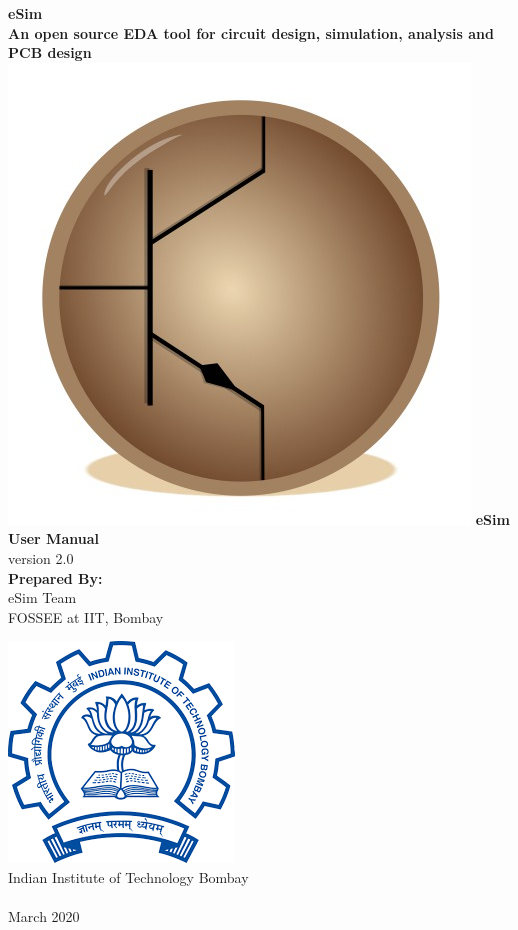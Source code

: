 \begin{center}
{\bf {\Huge eSim} \\ [0.1in]
\LARGE An open source EDA tool for circuit design,
  simulation, analysis and PCB design} \\
\vfill
\includegraphics[width=0.3\linewidth]{logo-trimmed.png}
\vfill
\LARGE \textbf{eSim User Manual} \\ 
\small{version 2.0}\\
\vspace{1cm}
\textbf{Prepared By:}\\
eSim Team\\
FOSSEE at IIT, Bombay

\vspace{1cm}
\includegraphics[width=0.2\linewidth]{iitblogo.png} \\
Indian Institute of Technology Bombay \\ [2mm]
{\LARGE \byncnd} \\ [1mm]
March 2020
\end{center}



\cleardoublepage
